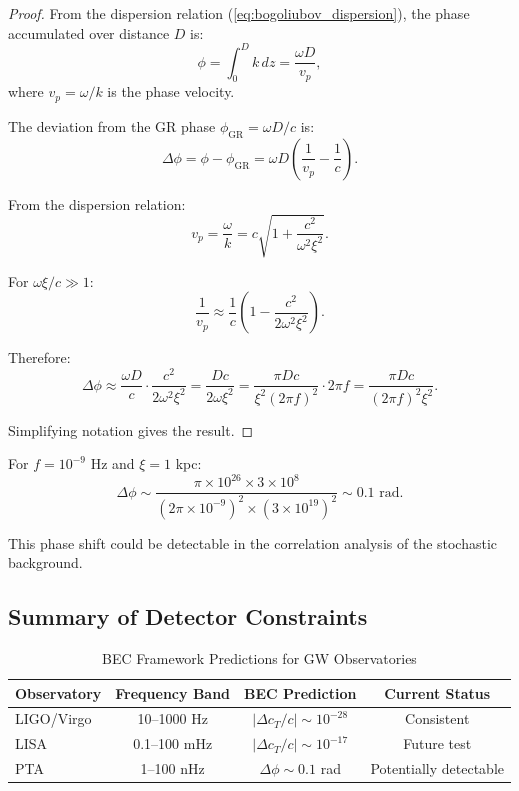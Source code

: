 \documentclass[11pt,a4paper]{article}
\newcommand{\cT}{\ensuremath{c_T}}
\theoremstyle{definition}
\theoremstyle{remark}
\begin{document}
\begin{proof}
From the dispersion relation (\ref{eq:bogoliubov_dispersion}), the phase accumulated over distance $D$ is:
\begin{equation}
\phi = \int_0^D k \, dz = \frac{\omega D}{v_p},
\end{equation}
where $v_p = \omega/k$ is the phase velocity.

The deviation from the GR phase $\phi_{\mathrm{GR}} = \omega D/c$ is:
\begin{equation}
\Delta\phi = \phi - \phi_{\mathrm{GR}} = \omega D\left(\frac{1}{v_p} - \frac{1}{c}\right).
\end{equation}

From the dispersion relation:
\begin{equation}
v_p = \frac{\omega}{k} = c\sqrt{1 + \frac{c^2}{\omega^2\xi^2}}.
\end{equation}

For $\omega\xi/c \gg 1$:
\begin{equation}
\frac{1}{v_p} \approx \frac{1}{c}\left(1 - \frac{c^2}{2\omega^2\xi^2}\right).
\end{equation}

Therefore:
\begin{equation}
\Delta\phi \approx \frac{\omega D}{c} \cdot \frac{c^2}{2\omega^2\xi^2} = \frac{Dc}{2\omega\xi^2} = \frac{\pi Dc}{\xi^2(2\pi f)^2} \cdot 2\pi f = \frac{\pi D c}{(2\pi f)^2\xi^2}.
\end{equation}

Simplifying notation gives the result. \qedhere
\end{proof}

For $f = 10^{-9}$ Hz and $\xi = 1$ kpc:
\begin{equation}
\Delta\phi \sim \frac{\pi \times 10^{26} \times 3 \times 10^8}{(2\pi \times 10^{-9})^2 \times (3 \times 10^{19})^2} \sim 0.1 \text{ rad}.
\end{equation}

This phase shift could be detectable in the correlation analysis of the stochastic background.

\subsection{Summary of Detector Constraints}
\label{sec:detector_summary}

\begin{table}[H]
\centering
\caption{BEC Framework Predictions for GW Observatories}
\label{tab:predictions}
\begin{tabular}{@{}lccc@{}}
\toprule
\textbf{Observatory} & \textbf{Frequency Band} & \textbf{BEC Prediction} & \textbf{Current Status} \\
\midrule
LIGO/Virgo & 10--1000 Hz & $|\Delta\cT/c| \sim 10^{-28}$ & Consistent \\
LISA & 0.1--100 mHz & $|\Delta\cT/c| \sim 10^{-17}$ & Future test \\
PTA & 1--100 nHz & $\Delta\phi \sim 0.1$ rad & Potentially detectable \\
\bottomrule
\end{tabular}
\end{table}
\end{document}
